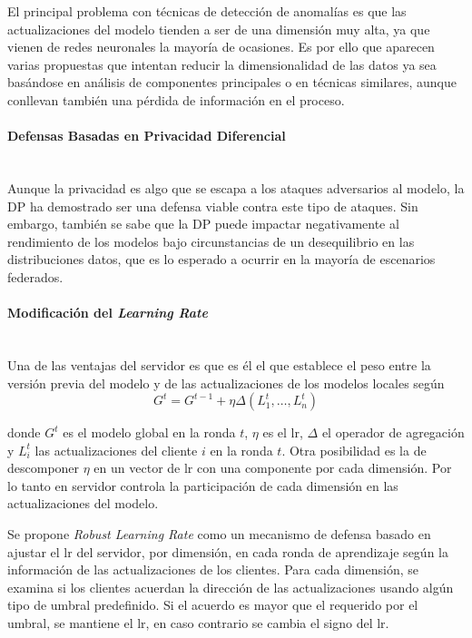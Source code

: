 El principal problema con técnicas de detección de anomalías es que las actualizaciones del modelo tienden a ser de una dimensión muy alta, ya que vienen de redes neuronales la mayoría de ocasiones. Es por ello que aparecen varias propuestas que intentan reducir la dimensionalidad de las datos ya sea basándose en análisis de componentes principales o en técnicas similares, aunque conllevan también una pérdida de información en el proceso.

\paragraph{Defensas Basadas en Privacidad Diferencial}\mbox{}\\
Aunque la privacidad es algo que se escapa a los ataques adversarios al modelo, la \ac{DP} ha demostrado ser una defensa viable contra este tipo de ataques. Sin embargo, también se sabe que la \ac{DP} puede impactar negativamente al rendimiento de los modelos bajo circunstancias de un desequilibrio en las distribuciones datos, que es lo esperado a ocurrir en la mayoría de escenarios federados.

\paragraph{Modificación del \textit{Learning Rate}}\mbox{}\\
Una de las ventajas del servidor es que es él el que establece el peso entre la versión previa del modelo y de las actualizaciones de los modelos locales según 
\begin{equation}
    G^t = G^{t-1} + \eta \Delta(L^t_1, \ldots, L^t_n)
\end{equation}

donde $G^t$ es el modelo global en la ronda $t$, $\eta$ es el \ac{lr}, $\Delta$ el operador de agregación y $L_i^t$ las actualizaciones del cliente $i$ en la ronda $t$. Otra posibilidad es la de descomponer $\eta$ en un vector de \ac{lr} con una componente por cada dimensión. Por lo tanto en servidor controla la participación de cada dimensión en las actualizaciones del modelo. 

Se propone \textit{Robust Learning Rate} como un mecanismo de defensa basado en ajustar el \ac{lr} del servidor, por dimensión, en cada ronda de aprendizaje según la información de las actualizaciones de los clientes. Para cada dimensión, se examina si los clientes acuerdan la dirección de las actualizaciones usando algún tipo de umbral predefinido. Si el acuerdo es mayor que el requerido por el umbral, se mantiene el \ac{lr}, en caso contrario se cambia el signo del \ac{lr}.

